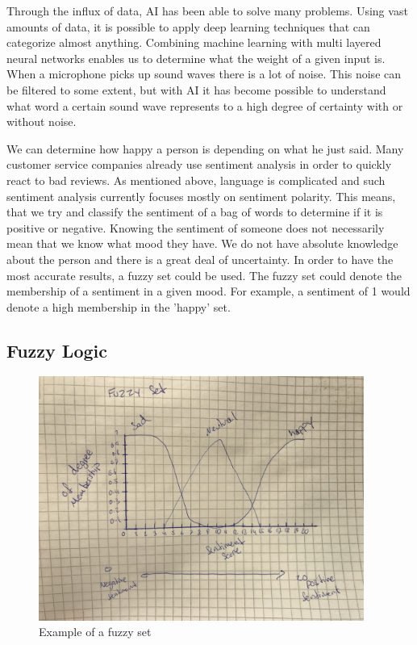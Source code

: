 \documentclass{lncs}
\begin{document}
Through the influx of data, AI has been able to solve many problems. Using vast amounts of data, it is possible to apply deep learning techniques that can categorize almost anything. Combining machine learning with multi layered neural networks enables us to determine what the weight of a given input is. When a microphone picks up sound waves there is a lot of noise. This noise can be filtered to some extent, but with AI it has become possible to understand what word a certain sound wave represents to a high degree of certainty with or without noise.

We can determine how happy a person is depending on what he just said. Many customer service companies already use sentiment analysis in order to quickly react to bad reviews. As mentioned above, language is complicated and such sentiment analysis currently focuses mostly on sentiment polarity. This means, that we try and classify the sentiment of a bag of words to determine if it is positive or negative. Knowing the sentiment of someone does not necessarily mean that we know what mood they have. We do not have absolute knowledge about the person and there is a great deal of uncertainty. In order to have the most accurate results, a fuzzy set could be used. The fuzzy set could denote the membership of a sentiment in a given mood. For example, a sentiment of 1 would denote a high membership in the 'happy' set.

\subsection{Fuzzy Logic}

\begin{figure}%
\includegraphics[width=\linewidth, height=8cm]{fuzzy.jpg}
\caption{Example of a fuzzy set}
\label{fig:fuzzy}
\end{figure}
\end{document}
